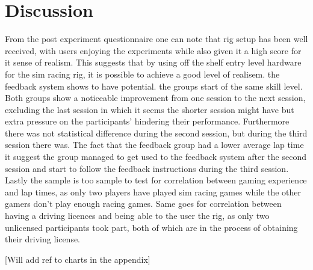 \section{Discussion}
\label{sec:eval-Discussion}

From the post experiment questionnaire one can note that rig setup has been well received, with users enjoying the experiments while also given it a high score for it sense of realism. This suggests that by using off the shelf entry level hardware for the sim racing rig, it is possible to achieve a good level of realisem. the feedback system shows to have potential. the groups start of the same skill level. Both groups show a noticeable improvement from one session to the next session, excluding the last session in which it seems the shorter session might have but extra pressure on the participants' hindering their performance. Furthermore there was not statistical difference during the second session, but during the third session there was. The fact that the feedback group had a lower average lap time it suggest the group managed to get used to the feedback system after the second session and start to follow the feedback instructions during the third session. Lastly the sample is too sample to test for correlation between gaming experience and lap times, as only two players have played sim racing games while the other gamers don't play enough racing games. Same goes for correlation between having a driving licences and being able to the user the rig, as only two unlicensed participants took part, both of which are in the process of obtaining their driving license.

[Will add ref to charts in the appendix]